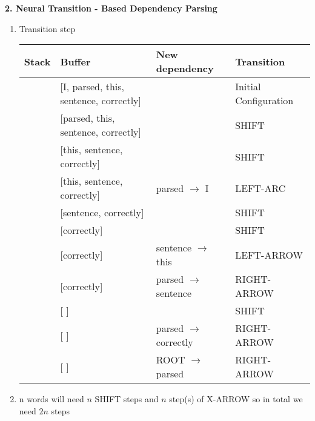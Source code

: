 \documentclass{article}
\begin{document}
\textbf{2. Neural Transition - Based Dependency Parsing}

\begin{enumerate}[label=(\alph*)]
	\item Transition step
	\begin{center}
	
		\begin{tabular}{p{3.5cm}|p{3.5cm}|p{3.5cm}|p{3.5cm}}
			Stack & Buffer & New dependency & Transition \\
			\hline \hline
			[ROOT] 	 & [I, parsed, this, sentence, correctly] & & Initial Configuration \\
			\hline
			[ROOT,I] & [parsed, this, sentence, correctly]    & & SHIFT \\
			\hline
			[ROOT,I,parsed] & [this, sentence, correctly] & & SHIFT \\
			\hline
			[ROOT, parsed] & [this, sentence, correctly] & parsed $\rightarrow$ I & LEFT-ARC \\
			\hline
			[ROOT, parsed, this] & [sentence, correctly] & & SHIFT \\
			\hline 
			[ROOT, parsed, this, sentence] & [correctly] & & SHIFT \\
			\hline
			[ROOT, parsed, sentence] & [correctly] & sentence $\rightarrow$ this & LEFT-ARROW \\
			\hline
			[ROOT, parsed] & [correctly] & parsed $\rightarrow$ sentence & RIGHT-ARROW \\
			\hline
			[ROOT, parsed, correctly] & [ ] & & SHIFT \\
			\hline 
			[ROOT, parsed] & [ ] & parsed $\rightarrow$ correctly & RIGHT-ARROW \\
			\hline 
			[ROOT] & [ ] & ROOT $\rightarrow$ parsed & RIGHT-ARROW
		\end{tabular}
	\end{center}

	\item n words will need $n$ SHIFT steps and $n$ step(s) of X-ARROW so in total we need $2n$ steps
\end{enumerate}
\end{document}
